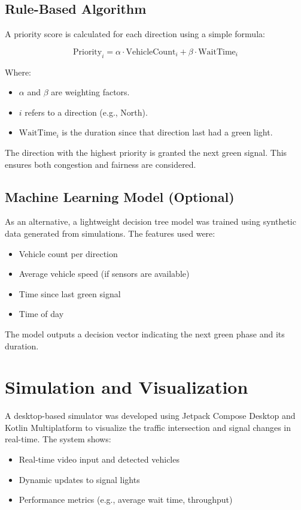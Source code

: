\subsection{Rule-Based Algorithm}

A priority score is calculated for each direction using a simple formula:

\[
    \text{Priority}_{i} = \alpha \cdot \text{VehicleCount}_{i} + \beta \cdot \text{WaitTime}_{i}
\]

Where:
\begin{itemize}
    \item $\alpha$ and $\beta$ are weighting factors.
    \item $i$ refers to a direction (e.g., North).
    \item $\text{WaitTime}_{i}$ is the duration since that direction last had a green light.
\end{itemize}

The direction with the highest priority is granted the next green signal. This ensures both congestion and fairness are considered.

\subsection{Machine Learning Model (Optional)}

As an alternative, a lightweight decision tree model was trained using synthetic data generated from simulations. The features used were:
\begin{itemize}
    \item Vehicle count per direction
    \item Average vehicle speed (if sensors are available)
    \item Time since last green signal
    \item Time of day
\end{itemize}

The model outputs a decision vector indicating the next green phase and its duration.

\section{Simulation and Visualization}

A desktop-based simulator was developed using Jetpack Compose Desktop and Kotlin Multiplatform to visualize the traffic intersection and signal changes in real-time. The system shows:
\begin{itemize}
    \item Real-time video input and detected vehicles
    \item Dynamic updates to signal lights
    \item Performance metrics (e.g., average wait time, throughput)
\end{itemize}

